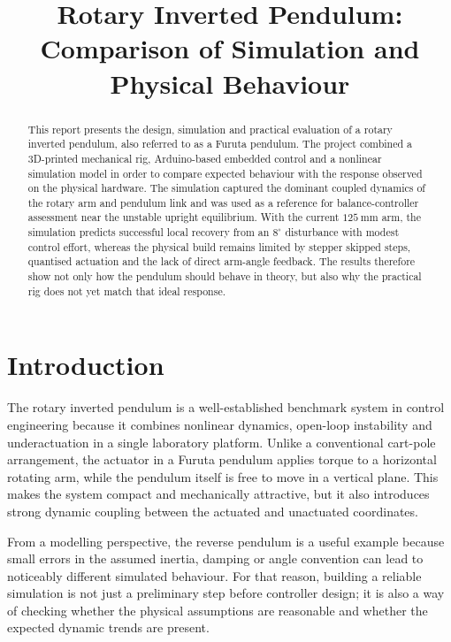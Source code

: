 \documentclass[conference]{IEEEtran}
\begin{document}
\title{Rotary Inverted Pendulum: Comparison of Simulation and Physical Behaviour}

\author{
}

\maketitle

\begin{abstract}
This report presents the design, simulation and practical evaluation of a rotary inverted pendulum, also referred to as a Furuta pendulum. The project combined a 3D-printed mechanical rig, Arduino-based embedded control and a nonlinear simulation model in order to compare expected behaviour with the response observed on the physical hardware. The simulation captured the dominant coupled dynamics of the rotary arm and pendulum link and was used as a reference for balance-controller assessment near the unstable upright equilibrium. With the current $125~\mathrm{mm}$ arm, the simulation predicts successful local recovery from an $8^\circ$ disturbance with modest control effort, whereas the physical build remains limited by stepper skipped steps, quantised actuation and the lack of direct arm-angle feedback. The results therefore show not only how the pendulum should behave in theory, but also why the practical rig does not yet match that ideal response.
\end{abstract}

\section{Introduction}
The rotary inverted pendulum is a well-established benchmark system in control engineering because it combines nonlinear dynamics, open-loop instability and underactuation in a single laboratory platform. Unlike a conventional cart-pole arrangement, the actuator in a Furuta pendulum applies torque to a horizontal rotating arm, while the pendulum itself is free to move in a vertical plane. This makes the system compact and mechanically attractive, but it also introduces strong dynamic coupling between the actuated and unactuated coordinates.

From a modelling perspective, the reverse pendulum is a useful example because small errors in the assumed inertia, damping or angle convention can lead to noticeably different simulated behaviour. For that reason, building a reliable simulation is not just a preliminary step before controller design; it is also a way of checking whether the physical assumptions are reasonable and whether the expected dynamic trends are present.
\end{document}
